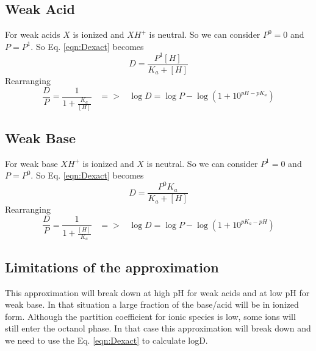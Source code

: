 \documentclass{article}
\begin{document}
\subsection{Weak Acid}
For weak acids $X$ is ionized and $XH^+$ is neutral. So we can consider $P^0 = 0$ and $P = P^1$. So Eq. \ref{eqn:Dexact} becomes
\begin{equation}
    D = \frac{P^1 [H]}{K_a + [H]}
\end{equation}
Rearranging
\begin{equation}
    \frac{D}{P} = \frac{1}{1+\frac{K_a}{[H]}} \;\;\; => \;\;\; \log D = \log P - \log(1+10^{pH-pK_a})
\end{equation}
\subsection{Weak Base}
For weak base $XH^+$ is ionized and $X$ is neutral. So we can consider $P^1 = 0$ and $P = P^0$. So Eq. \ref{eqn:Dexact} becomes
\begin{equation}
    D = \frac{P^0 K_a}{K_a + [H]}
\end{equation}
Rearranging
\begin{equation}
    \frac{D}{P} = \frac{1}{1+\frac{[H]}{K_a}} \;\;\; => \;\;\; \log D = \log P - \log(1+10^{pK_a-pH})
\end{equation}
\subsection{Limitations of the approximation}
This approximation will break down at high pH for weak acids and at low pH for weak base. In that situation a large fraction of the base/acid will be in ionized form. Although the partition coefficient for ionic species is low, some ions will still enter the octanol phase. In that case this approximation will break down and we need to use the Eq. \ref{eqn:Dexact} to calculate logD.
%
%
\end{document}
